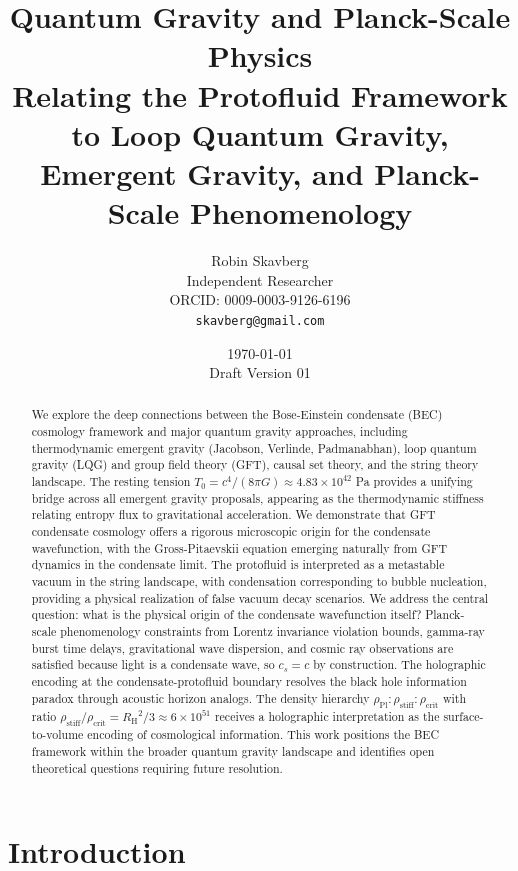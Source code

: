 \documentclass[11pt,a4paper]{article}
\title{\textbf{Quantum Gravity and Planck-Scale Physics}\\[0.5em]
\large Relating the Protofluid Framework to Loop Quantum Gravity,\\
Emergent Gravity, and Planck-Scale Phenomenology}
\author{Robin Skavberg\\[0.3em]
\small Independent Researcher\\
\small ORCID: 0009-0003-9126-6196\\
\small \texttt{skavberg@gmail.com}}
\date{\today\\[0.5em]
\small Draft Version 01}
\newcommand{\rhocrit}{\ensuremath{\rho_{\mathrm{crit}}}}
\newcommand{\rhostiff}{\ensuremath{\rho_{\mathrm{stiff}}}}
\newcommand{\rhoPl}{\ensuremath{\rho_{\mathrm{Pl}}}}
\newcommand{\Tzero}{\ensuremath{T_0}}
\newcommand{\cs}{\ensuremath{c_s}}
\newcommand{\RH}{\ensuremath{R_{\mathrm{H}}}}
\theoremstyle{definition}
\theoremstyle{remark}
\begin{document}
\maketitle

\begin{abstract}
We explore the deep connections between the Bose-Einstein condensate (BEC) cosmology framework and major quantum gravity approaches, including thermodynamic emergent gravity (Jacobson, Verlinde, Padmanabhan), loop quantum gravity (LQG) and group field theory (GFT), causal set theory, and the string theory landscape. The resting tension $\Tzero = c^4/(8\pi G) \approx 4.83 \times 10^{42}$ Pa provides a unifying bridge across all emergent gravity proposals, appearing as the thermodynamic stiffness relating entropy flux to gravitational acceleration. We demonstrate that GFT condensate cosmology offers a rigorous microscopic origin for the condensate wavefunction, with the Gross-Pitaevskii equation emerging naturally from GFT dynamics in the condensate limit. The protofluid is interpreted as a metastable vacuum in the string landscape, with condensation corresponding to bubble nucleation, providing a physical realization of false vacuum decay scenarios. We address the central question: what is the physical origin of the condensate wavefunction itself? Planck-scale phenomenology constraints from Lorentz invariance violation bounds, gamma-ray burst time delays, gravitational wave dispersion, and cosmic ray observations are satisfied because light is a condensate wave, so $\cs = c$ by construction. The holographic encoding at the condensate-protofluid boundary resolves the black hole information paradox through acoustic horizon analogs. The density hierarchy $\rhoPl : \rhostiff : \rhocrit$ with ratio $\rhostiff/\rhocrit = \RH^2/3 \approx 6 \times 10^{51}$ receives a holographic interpretation as the surface-to-volume encoding of cosmological information. This work positions the BEC framework within the broader quantum gravity landscape and identifies open theoretical questions requiring future resolution.
\end{abstract}

\tableofcontents
\newpage

\section{Introduction}
\label{sec:introduction}
\end{document}
